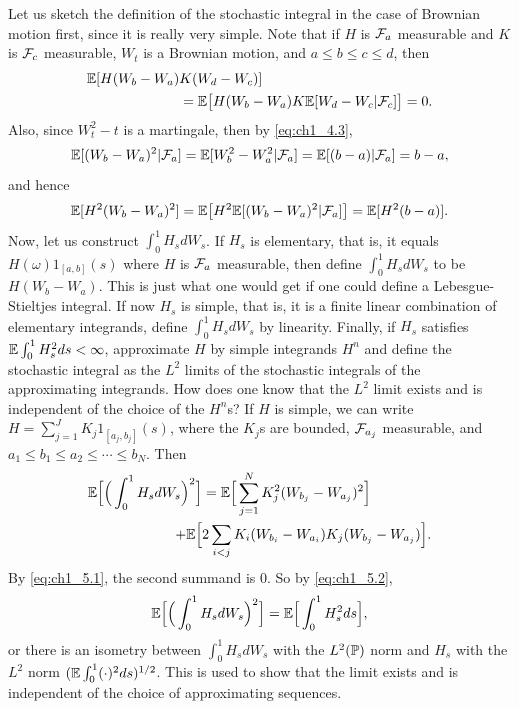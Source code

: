 Let us sketch the definition of the stochastic integral in the case of Brownian motion first, since it is really very simple. Note that if $H$ is $\FC_a$ measurable and $K$ is $\FC_c$ measurable, $W_t$ is a Brownian motion, and $a \leq b \leq c \leq d$, then
\begin{align}\label{eq:ch1_5.1}
    \E[H(W_b - W_a)&K(W_d - W_c)] \\
    &= \E\big[H(W_b - W_a)K\E[W_d - W_c\mid \FC_c]\big] = 0. \notag
\end{align}
Also, since $W_t^2 - t$ is a martingale, then by \eqref{eq:ch1_4.3},
\[
    \E[(W_b - W_a)^2\mid \FC_a] = \E[W_b^2 - W_a^2\mid \FC_a] = \E[(b-a)\mid \FC_a] = b-a,
\]
and hence
\begin{equation}\label{eq:ch1_5.2}
    \E[H^2(W_b - W_a)^2] = \E\big[H^2\E[(W_b - W_a)^2\mid \FC_a]\big] = \E[H^2(b-a)].
\end{equation}
Now, let us construct $\int_0^1 H_s dW_s$. If $H_s$ is elementary, that is, it equals $H(\omega)1_{[a,b]}(s)$ where $H$ is $\FC_a$ measurable, then define $\int_0^1 H_s dW_s$ to be $H(W_b-W_a)$. This is just what one would get if one could define a Lebesgue-Stieltjes integral. If now $H_s$ is simple, that is, it is a finite linear combination of elementary integrands, define $\int_0^1 H_s dW_s$ by linearity. Finally, if $H_s$ satisfies $\E \int_0^1 H_s^2 ds < \infty$, approximate $H$ by simple integrands $H^n$ and define the stochastic integral as the $L^2$ limits of the stochastic integrals of the approximating integrands. How does one know that the $L^2$ limit exists and is independent of the choice of the $H^n$s? If $H$ is simple, we can write $H = \sum_{j=1}^J K_j1_{[a_j,b_j]}(s)$, where the $K_j$s are bounded, $\FC_{a_j}$ measurable, and $a_1 \leq b_1 \leq a_2 \leq \cdots \leq b_N$. Then
\mpagebreak
\begin{align*}
    \E\Big[\Big(\int_0^1 H_s dW_s\Big)^2&\Big] = \E\Big[\sum_{j=1}^N K_j^2(W_{b_j} - W_{a_j})^2\Big] \\
    + \E&\Big[2\sum_{i<j} K_i(W_{b_i} - W_{a_i})K_j(W_{b_j} - W_{a_j})\Big].
\end{align*}
By \eqref{eq:ch1_5.1}, the second summand is $0$. So by \eqref{eq:ch1_5.2},
\[
    \E\Big[\Big(\int_0^1 H_s dW_s\Big)^2\Big] = \E\Big[\int_0^1 H_s^2 ds\Big],
\]
or there is an isometry between $\int_0^1 H_s dW_s$ with the $L^2(\P)$ norm and $H_s$ with the $L^2$ norm $(\E \int_0^1 (\cdot)^2 ds)^{1/2}$. This is used to show that the limit exists and is independent of the choice of approximating sequences.

